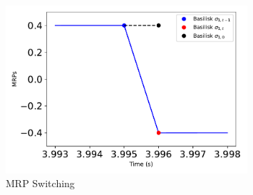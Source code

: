 \begin{figure}[htbp]\centerline{\includegraphics[width=0.8\textwidth]{AutoTeX/scPlusMRPSwitching}}\caption{MRP Switching}\label{fig:scPlusMRPSwitching}\end{figure}